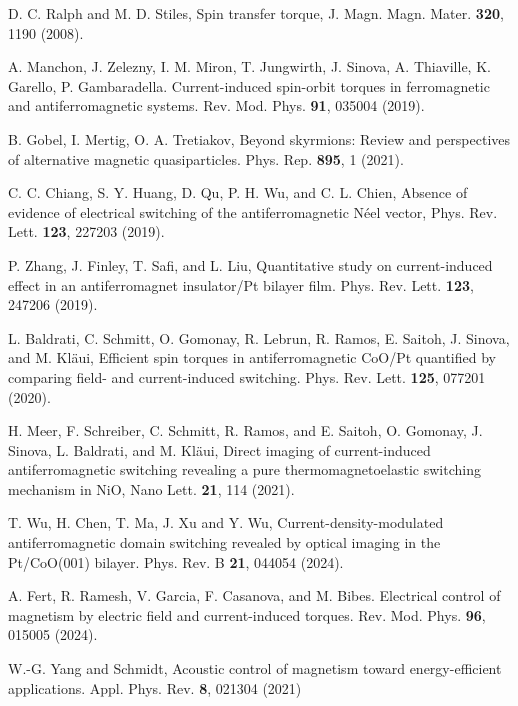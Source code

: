 \documentclass[aps,prl,reprint,floatfix,longbibliography,twocolumn]{revtex4-2}
\begin{document}
\begin{thebibliography}{}

 D. C. Ralph and M. D. Stiles, Spin transfer torque, J. Magn. Magn. Mater. \textbf{320}, 1190 (2008).

A. Manchon, J. Zelezny, I. M. Miron, T. Jungwirth, J. Sinova, A. Thiaville, K. Garello, P. Gambaradella. Current-induced spin-orbit torques in ferromagnetic and antiferromagnetic systems. Rev. Mod. Phys. \textbf{91}, 035004 (2019).

 B. Gobel, I. Mertig, O. A. Tretiakov, Beyond skyrmions: Review and perspectives of alternative magnetic quasiparticles. Phys. Rep. \textbf{895}, 1 (2021).

 C. C. Chiang, S. Y. Huang, D. Qu, P. H. Wu, and C. L. Chien, Absence of evidence of electrical switching of
the antiferromagnetic Néel vector, Phys. Rev. Lett. \textbf{123}, 227203 (2019).

 P. Zhang, J. Finley, T. Safi, and L. Liu, Quantitative study on current-induced effect in an antiferromagnet
insulator/Pt bilayer film. Phys. Rev. Lett. \textbf{123}, 247206 (2019).


 L. Baldrati, C. Schmitt, O. Gomonay, R. Lebrun, R. Ramos, E. Saitoh, J. Sinova, and M. Kl\"{a}ui, Efficient spin
torques in antiferromagnetic CoO/Pt quantified by comparing field- and current-induced switching. Phys. Rev. Lett. \textbf{125}, 077201 (2020).

 H. Meer, F. Schreiber, C. Schmitt, R. Ramos, and E. Saitoh, O. Gomonay, J. Sinova, L. Baldrati, and M. Kl\"{a}ui, Direct imaging of current-induced antiferromagnetic switching revealing a pure thermomagnetoelastic switching mechanism in NiO, Nano Lett. \textbf{21}, 114 (2021).



 T. Wu, H. Chen, T. Ma, J. Xu and Y. Wu, Current-density-modulated antiferromagnetic domain switching revealed by
optical imaging in the Pt/CoO(001) bilayer. Phys. Rev. B \textbf{21}, 044054 (2024).

 A. Fert, R. Ramesh, V. Garcia, F. Casanova, and M. Bibes. Electrical control of magnetism by electric field and current-induced torques. Rev. Mod. Phys. \textbf{96}, 015005 (2024).

 W.-G. Yang and Schmidt, Acoustic control of magnetism toward energy-efficient applications. Appl. Phys. Rev. \textbf{8}, 021304 (2021)


\end{thebibliography}
\end{document}
